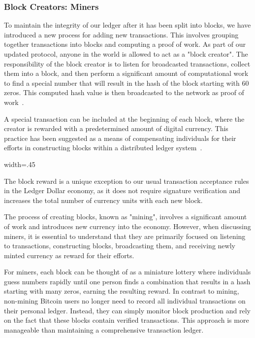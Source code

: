 \subsubsection{Block Creators: Miners}
To maintain the integrity of our ledger after it has been split into blocks, we have introduced a new process for adding new
transactions. This involves grouping together transactions into blocks and computing a proof of work. As part of our updated protocol,
anyone in the world is allowed to act as a "block creator". The responsibility of the block creator is to listen for broadcasted transactions,
collect them into a block, and then perform a significant amount of computational work to find a special number that will result in the
hash of the block starting with 60 zeros. This computed hash value is then broadcasted to the network as proof of work~\cite{wood2014ethereum}.

A special transaction can be included at the beginning of each block, where the creator is rewarded with a predetermined amount of digital
currency. This practice has been suggested as a means of compensating individuals for their efforts in constructing blocks within a
distributed ledger system~\cite{ding2020incentive}.

{width=.45\textwidth}%

The block reward is a unique exception to our usual transaction acceptance rules in the Ledger Dollar economy, as it does not require
signature verification and increases the total number of currency units with each new block.

The process of creating blocks, known as
"mining", involves a significant amount of work and introduces new currency into the economy. However, when discussing miners, it is
essential to understand that they are primarily focused on listening to transactions, constructing blocks, broadcasting them, and
receiving newly minted currency as reward for their efforts.

For miners, each block can be thought of as a miniature lottery where individuals guess numbers rapidly until one person finds a combination
that results in a hash starting with many zeros, earning the resulting reward. In contrast to mining, non-mining Bitcoin users no longer
need to record all individual transactions on their personal ledger. Instead, they can simply monitor block production and rely on the
fact that these blocks contain verified transactions. This approach is more manageable than maintaining a comprehensive transaction ledger.

